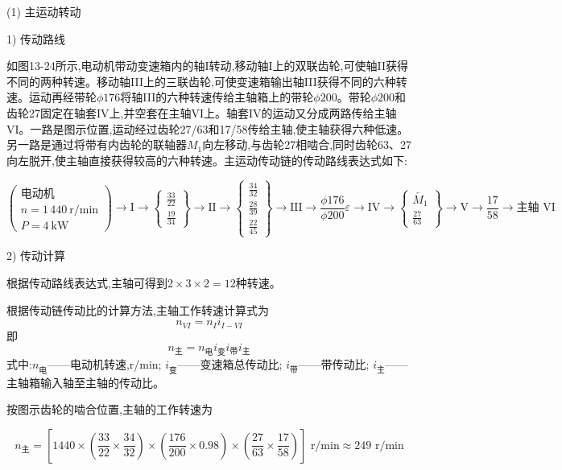 \documentclass[UTF8]{ctexbook}
\newcommand{\◎}{\ensuremath{\bigcirc}}
\begin{document}
(1) 主运动转动

1) 传动路线

如图13-24所示,电动机带动变速箱内的轴I转动,移动轴I上的双联齿轮,可使轴II获得不同的两种转速。移动轴III上的三联齿轮,可使变速箱输出轴III获得不同的六种转速。运动再经带轮$\phi 176$将轴III的六种转速传给主轴箱上的带轮$\phi 200$。带轮$\phi 200$和齿轮27固定在轴套IV上,并空套在主轴VI上。轴套IV的运动又分成两路传给主轴VI。一路是图示位置,运动经过齿轮27/63和17/58传给主轴,使主轴获得六种低速。另一路是通过将带有内齿轮的联轴器$M_1$向左移动,与齿轮27相啮合,同时齿轮63、27向左脱开,使主轴直接获得较高的六种转速。主运动传动链的传动路线表达式如下:

\[
\left(
\begin{matrix}
	\text{电动机} \\
	n = 1\,440\ \text{r/min} \\
	P = 4\ \text{kW}
\end{matrix}
\right)
\to \text{I} \to
\begin{Bmatrix}
	\frac{33}{22} \\
	\frac{19}{34}
\end{Bmatrix}
\to \text{II} \to
\begin{Bmatrix}
	\frac{34}{32} \\
	\frac{28}{39} \\
	\frac{22}{45}
\end{Bmatrix}
\to \text{III} \to \frac{\phi 176}{\phi 200} \varepsilon \to \text{IV} \to
\begin{Bmatrix}
	\overleftarrow{M_1} \\
	\frac{27}{63}
\end{Bmatrix}
\to \text{V} \to \frac{17}{58} \to \text{主轴 VI}
\]

2) 传动计算

根据传动路线表达式,主轴可得到$2 \times 3 \times 2 = 12$种转速。

根据传动链传动比的计算方法,主轴工作转速计算式为
\[ n_{VI} = n_I i_{I-VI} \]
即
\[ n_{\text{主}} = n_{\text{电}} i_{\text{变}} i_{\text{带}} i_{\text{主}} \]
式中:$n_{\text{电}}$——电动机转速,r/min;
$i_{\text{变}}$——变速箱总传动比;
$i_{\text{带}}$——带传动比;
$i_{\text{主}}$——主轴箱输入轴至主轴的传动比。

按图示齿轮的啮合位置,主轴的工作转速为

\[ n_{\text{主}} = \left[ 1440 \times \left( \frac{33}{22} \times \frac{34}{32} \right) \times \left( \frac{176}{200} \times 0.98 \right) \times \left( \frac{27}{63} \times \frac{17}{58} \right) \right] \text{ r/min} \approx 249 \text{ r/min} \]
\end{document}
